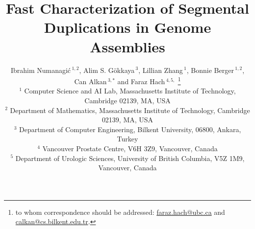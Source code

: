 \documentclass{article}
\date{}
\begin{document}
\title{Fast Characterization of Segmental Duplications in Genome Assemblies}

\author{
  Ibrahim Numanagić\,$^{1,2}$, 
  Alim S. Gökkaya\,$^{3}$, 
  Lillian Zhang\,$^{1}$, 
  Bonnie Berger\,$^{1,2}$, \\
  Can Alkan\,$^{3,*}$ and 
  Faraz Hach\,$^{4,5,}$
  \footnote{to whom correspondence should be addressed:
    \href{mailto:faraz.hach@ubc.ca}{faraz.hach@ubc.ca} and
    \href{mailto:calkan@cs.bilkent.edu.tr}{calkan@cs.bilkent.edu.tr}.
  }\\          
  \footnotesize
  $^{1}$ Computer Science and AI Lab, Massachusetts Institute of Technology, Cambridge 02139, MA, USA\\
  \footnotesize
  $^{2}$ Department of Mathematics, Massachusetts Institute of Technology, Cambridge 02139, MA, USA\\
  \footnotesize $^{3}$ Department of Computer Engineering, Bilkent University, 06800, Ankara, Turkey\\
  \footnotesize $^{4}$ Vancouver Prostate Centre, V6H 3Z9, Vancouver, Canada\\
  \footnotesize $^{5}$ Department of Urologic Sciences, University of British Columbia, V5Z 1M9, Vancouver, Canada\\
}

\maketitle
\end{document}
